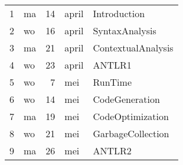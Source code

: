 
\begin{tabular}{rlrll}
 1 & ma & 14 & april & Introduction \\
 2 & wo & 16 & april & SyntaxAnalysis \\
 3 & ma & 21 & april & ContextualAnalysis \\
 4 & wo & 23 & april & ANTLR1 \\
 5 & wo &  7 & mei   & RunTime \\
 6 & wo & 14 & mei   & CodeGeneration \\
 7 & ma & 19 & mei   & CodeOptimization \\
 8 & wo & 21 & mei   & GarbageCollection \\
 9 & ma & 26 & mei   & ANTLR2 \\
\end{tabular}

